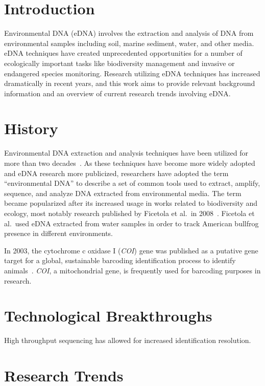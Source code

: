 \documentclass[letterpaper, 10pt, hidelinks]{article}
\begin{document}
\section{Introduction}

Environmental DNA (eDNA) involves the extraction and analysis of DNA from environmental samples including 
soil, marine sediment, water, and other media. eDNA techniques have created unprecedented opportunities for 
a number of ecologically important tasks like biodiversity management and invasive or endangered species 
monitoring. 
Research utilizing eDNA techniques has increased dramatically in recent years, and this work 
aims to provide relevant background information and an overview of current research trends involving 
eDNA.

\section{History}

Environmental DNA extraction and analysis techniques have been utilized for more than two 
decades~\cite{Paul1990, Trevors1989, Somerville1989}. As these techniques have become more widely 
adopted and eDNA research more publicized, researchers have adopted the term 
``environmental DNA'' to describe a set of common tools used to extract, amplify, sequence, and 
analyze DNA extracted from environmental media. The term became popularized after its 
increased usage in works related to biodiversity and ecology, most notably research published 
by Ficetola et al.\ in 2008~\cite{Ficetola2008}. Ficetola et al.\ used eDNA extracted from 
water samples in order to track American bullfrog presence in different environments.

In 2003, the cytochrome c oxidase I (\emph{COI}) gene was published as a putative 
gene target for a global, sustainable barcoding identification process to identify 
animals~\cite{Hebert2003}. \emph{COI}, a mitochondrial gene, is frequently used for 
barcoding purposes in research. 

\section{Technological Breakthroughs}

High throughput sequencing has allowed for increased identification resolution.

\section{Research Trends}
\end{document}
